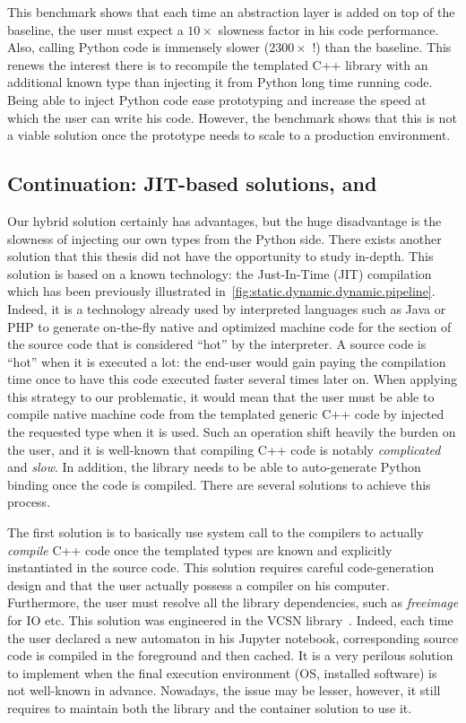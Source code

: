 This benchmark shows that each time an abstraction layer is added on top of the baseline, the user must expect a
\(10\times\) slowness factor in his code performance. Also, calling Python code is immensely slower (\(2300\times\) !)
than the baseline. This renews the interest there is to recompile the templated C++ library with an additional known
type than injecting it from Python long time running code. Being able to inject Python code ease prototyping and
increase the speed at which the user can write his code. However, the benchmark shows that this is not a viable solution
once the prototype needs to scale to a production environment.


\subsection{Continuation: JIT-based solutions, \pros and \cons}

Our hybrid solution certainly has advantages, but the huge disadvantage is the slowness of injecting our own types from
the Python side. There exists another solution that this thesis did not have the opportunity to study in-depth. This
solution is based on a known technology: the Just-In-Time (JIT) compilation which has been previously illustrated
in~\cref{fig:static.dynamic.dynamic.pipeline}. Indeed, it is a technology already used by interpreted languages such as
Java or PHP to generate on-the-fly native and optimized machine code for the section of the source code that is
considered ``hot'' by the interpreter. A source code is ``hot'' when it is executed a lot: the end-user would gain
paying the compilation time once to have this code executed faster several times later on. When applying this strategy
to our problematic, it would mean that the user must be able to compile native machine code from the templated generic
C++ code by injected the requested type when it is used. Such an operation shift heavily the burden on the user, and it
is well-known that compiling C++ code is notably \emph{complicated} and \emph{slow}. In addition, the library needs to
be able to auto-generate Python binding once the code is compiled. There are several solutions to achieve this process.

The first solution is to basically use system call to the compilers to actually \emph{compile} C++ code once the
templated types are known and explicitly instantiated in the source code. This solution requires careful code-generation
design and that the user actually possess a compiler on his computer. Furthermore, the user must resolve all the
library dependencies, such as \emph{freeimage} for IO etc. This solution was engineered in the VCSN
library~\parencite{demaille.2013.vcsn}. Indeed, each time the user declared a new automaton in his Jupyter notebook,
corresponding source code is compiled in the foreground and then cached. It is a very perilous solution to implement
when the final execution environment (OS, installed software) is not well-known in advance. Nowadays, the issue may be
lesser, however, it still requires to maintain both the library and the container solution to use it.

